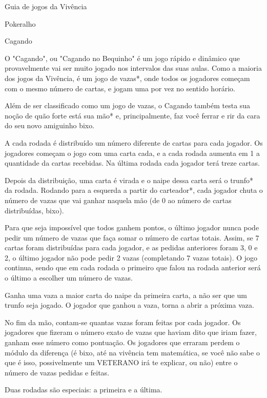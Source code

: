 \begin{secao}{Guia de jogos da Vivência }
\begin{subsecao}{Pokeralho}
\begin{itemize}
\end{itemize}


\end{subsecao}
\begin{subsecao}{Cagando}

O "Cagando", ou "Cagando no Bequinho" é um jogo rápido e dinâmico que provavelmente vai ser muito jogado nos intervalos das suas aulas. Como a maioria dos jogos da Vivência, é um jogo de vazas*, onde todos os jogadores começam com o mesmo número de cartas, e jogam uma por vez no sentido horário. 

Além de ser classificado como um jogo de vazas, o Cagando também testa sua noção de quão forte está sua mão* e, principalmente, faz você ferrar e rir da cara do seu novo amiguinho bixo. 

A cada rodada é distribuído um número diferente de cartas para cada jogador. Os jogadores começam o jogo com uma carta cada, e a cada rodada aumenta em 1 a quantidade da cartas recebidas. Na última rodada cada jogador terá treze cartas. 

Depois da distribuição, uma carta é virada e o naipe dessa carta será o trunfo* da rodada. Rodando para a esquerda a partir do carteador*, cada jogador chuta o número de vazas que vai ganhar naquela mão (de 0 ao número de cartas distribuídas, bixo). 

Para que seja impossível que todos ganhem pontos, o último jogador nunca pode pedir um número de vazas que faça somar o número de cartas totais. Assim, se 7 cartas foram distribuídas para cada jogador, e as pedidas anteriores foram 3, 0 e 2, o último jogador não pode pedir 2 vazas (completando 7 vazas totais). O jogo continua, sendo que em cada rodada o primeiro que falou na rodada anterior será o último a escolher um número de vazas. 

Ganha uma vaza a maior carta do naipe da primeira carta, a não ser que um trunfo seja jogado. O jogador que ganhou a vaza, torna a abrir a próxima vaza. 

No fim da mão, contam-se quantas vazas foram feitas por cada jogador. Os jogadores que fizeram o número exato de vazas que haviam dito que iriam fazer, ganham esse número como pontuação. Os jogadores que erraram perdem o módulo da diferença (é bixo, até na vivência tem matemática, se você não sabe o que é isso, possivelmente um VETERANO irá te explicar, ou não) entre o número de vazas pedidas e feitas. 

Duas rodadas são especiais: a primeira e a última. 


\end{subsecao}
\end{secao}
